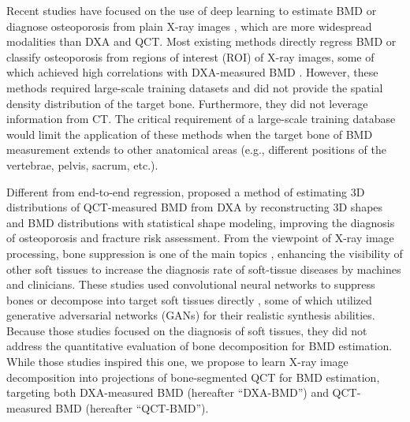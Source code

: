 \documentclass[times,twocolumn,final]{elsarticle}
\begin{document}
Recent studies have focused on the use of deep learning to estimate BMD or diagnose osteoporosis from plain X-ray images \citep{hsieh_automated_2021,yamamoto_deep_2020,jang_prediction_2021,ho_application_2021,gu_bmd-gan_2022}\citep{wang_lumbar_2023}, which are more widespread modalities than DXA and QCT. 
Most existing methods directly regress BMD or classify osteoporosis from regions of interest (ROI) of X-ray images, some of which achieved high correlations with DXA-measured BMD \citep{hsieh_automated_2021,wang_lumbar_2023}.
However, these methods required large-scale training datasets and did not provide the spatial density distribution of the target bone.
Furthermore, they did not leverage information from CT.
The critical requirement of a large-scale training database would limit the application of these methods when the target bone of BMD measurement extends to other anatomical areas (e.g., different positions of the vertebrae, pelvis, sacrum, etc.).

Different from end-to-end regression, \citet{whitmarsh_reconstructing_2011} proposed a method of estimating 3D distributions of QCT-measured BMD from DXA by reconstructing 3D shapes and BMD distributions with statistical shape modeling, improving the diagnosis of osteoporosis and fracture risk assessment. 
From the viewpoint of X-ray image processing, bone suppression is one of the main topics \citep{suzuki_image-processing_2006,yang_cascade_2017,liu_automatic_2019,eslami_image--images_2020}, enhancing the visibility of other soft tissues to increase the diagnosis rate of soft-tissue diseases by machines and clinicians. 
These studies used convolutional neural networks to suppress bones \citep{suzuki_image-processing_2006,yang_cascade_2017} or decompose into target soft tissues directly \citep{eslami_image--images_2020}, some of which utilized generative adversarial networks (GANs) \citep{isola_image--image_2017} for their realistic synthesis abilities. 
Because those studies focused on the diagnosis of soft tissues, they did not address the quantitative evaluation of bone decomposition for BMD estimation.
While those studies inspired this one, we propose to learn X-ray image decomposition into projections of bone-segmented QCT for BMD estimation, targeting both DXA-measured BMD (hereafter ``DXA-BMD'') and QCT-measured BMD (hereafter ``QCT-BMD''). 
\end{document}
